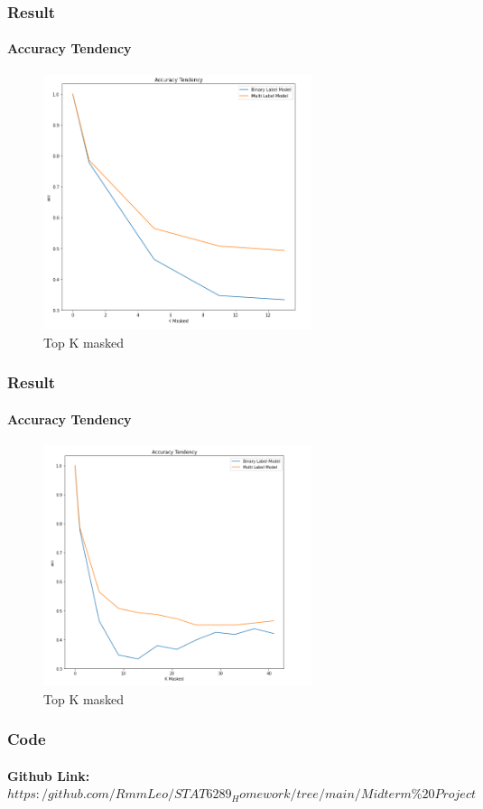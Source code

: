 \documentclass{beamer}
\begin{document}
\begin{frame}
    \frametitle{Result}
    \framesubtitle{Accuracy Tendency}
    \begin{figure}
        \centering
            \includegraphics[width=0.7\textwidth]{Accuracy Tendency.png}
            \caption{Top K masked}
            \label{fig:MaskedExample}
    \end{figure}
\end{frame}

\begin{frame}
    \frametitle{Result}
    \framesubtitle{Accuracy Tendency}
    \begin{figure}
        \centering
            \includegraphics[width=0.7\textwidth]{Accuracy Tendency2.png}
            \caption{Top K masked}
            \label{fig:MaskedExample}
    \end{figure}
\end{frame}

\begin{frame}
    \frametitle{Code}
    \framesubtitle{Github Link: \\ $https:/github.com/RmmLeo/STAT6289_Homework/tree/main/Midterm\%20Project$}

\end{frame}
\end{document}
